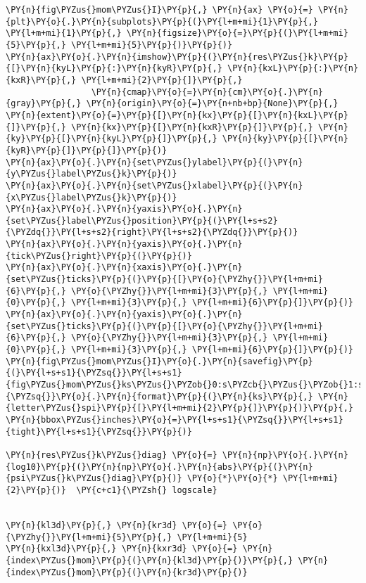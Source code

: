 \begin{Verbatim}[commandchars=\\\{\}]
\PY{n}{fig\PYZus{}mom\PYZus{}I}\PY{p}{,} \PY{n}{ax} \PY{o}{=} \PY{n}{plt}\PY{o}{.}\PY{n}{subplots}\PY{p}{(}\PY{l+m+mi}{1}\PY{p}{,} \PY{l+m+mi}{1}\PY{p}{,} \PY{n}{figsize}\PY{o}{=}\PY{p}{(}\PY{l+m+mi}{5}\PY{p}{,} \PY{l+m+mi}{5}\PY{p}{)}\PY{p}{)}
\PY{n}{ax}\PY{o}{.}\PY{n}{imshow}\PY{p}{(}\PY{n}{res\PYZus{}k}\PY{p}{[}\PY{n}{kyL}\PY{p}{:}\PY{n}{kyR}\PY{p}{,} \PY{n}{kxL}\PY{p}{:}\PY{n}{kxR}\PY{p}{,} \PY{l+m+mi}{2}\PY{p}{]}\PY{p}{,}
                 \PY{n}{cmap}\PY{o}{=}\PY{n}{cm}\PY{o}{.}\PY{n}{gray}\PY{p}{,} \PY{n}{origin}\PY{o}{=}\PY{n+nb+bp}{None}\PY{p}{,} \PY{n}{extent}\PY{o}{=}\PY{p}{[}\PY{n}{kx}\PY{p}{[}\PY{n}{kxL}\PY{p}{]}\PY{p}{,} \PY{n}{kx}\PY{p}{[}\PY{n}{kxR}\PY{p}{]}\PY{p}{,} \PY{n}{ky}\PY{p}{[}\PY{n}{kyL}\PY{p}{]}\PY{p}{,} \PY{n}{ky}\PY{p}{[}\PY{n}{kyR}\PY{p}{]}\PY{p}{]}\PY{p}{)}
\PY{n}{ax}\PY{o}{.}\PY{n}{set\PYZus{}ylabel}\PY{p}{(}\PY{n}{y\PYZus{}label\PYZus{}k}\PY{p}{)}
\PY{n}{ax}\PY{o}{.}\PY{n}{set\PYZus{}xlabel}\PY{p}{(}\PY{n}{x\PYZus{}label\PYZus{}k}\PY{p}{)}
\PY{n}{ax}\PY{o}{.}\PY{n}{yaxis}\PY{o}{.}\PY{n}{set\PYZus{}label\PYZus{}position}\PY{p}{(}\PY{l+s+s2}{\PYZdq{}}\PY{l+s+s2}{right}\PY{l+s+s2}{\PYZdq{}}\PY{p}{)}
\PY{n}{ax}\PY{o}{.}\PY{n}{yaxis}\PY{o}{.}\PY{n}{tick\PYZus{}right}\PY{p}{(}\PY{p}{)}
\PY{n}{ax}\PY{o}{.}\PY{n}{xaxis}\PY{o}{.}\PY{n}{set\PYZus{}ticks}\PY{p}{(}\PY{p}{[}\PY{o}{\PYZhy{}}\PY{l+m+mi}{6}\PY{p}{,} \PY{o}{\PYZhy{}}\PY{l+m+mi}{3}\PY{p}{,} \PY{l+m+mi}{0}\PY{p}{,} \PY{l+m+mi}{3}\PY{p}{,} \PY{l+m+mi}{6}\PY{p}{]}\PY{p}{)}
\PY{n}{ax}\PY{o}{.}\PY{n}{yaxis}\PY{o}{.}\PY{n}{set\PYZus{}ticks}\PY{p}{(}\PY{p}{[}\PY{o}{\PYZhy{}}\PY{l+m+mi}{6}\PY{p}{,} \PY{o}{\PYZhy{}}\PY{l+m+mi}{3}\PY{p}{,} \PY{l+m+mi}{0}\PY{p}{,} \PY{l+m+mi}{3}\PY{p}{,} \PY{l+m+mi}{6}\PY{p}{]}\PY{p}{)}
\PY{n}{fig\PYZus{}mom\PYZus{}I}\PY{o}{.}\PY{n}{savefig}\PY{p}{(}\PY{l+s+s1}{\PYZsq{}}\PY{l+s+s1}{fig\PYZus{}mom\PYZus{}ks\PYZus{}\PYZob{}0:s\PYZcb{}\PYZus{}\PYZob{}1:s\PYZcb{}}\PY{l+s+s1}{\PYZsq{}}\PY{o}{.}\PY{n}{format}\PY{p}{(}\PY{n}{ks}\PY{p}{,} \PY{n}{letter\PYZus{}spi}\PY{p}{[}\PY{l+m+mi}{2}\PY{p}{]}\PY{p}{)}\PY{p}{,} \PY{n}{bbox\PYZus{}inches}\PY{o}{=}\PY{l+s+s1}{\PYZsq{}}\PY{l+s+s1}{tight}\PY{l+s+s1}{\PYZsq{}}\PY{p}{)}

\PY{n}{res\PYZus{}k\PYZus{}diag} \PY{o}{=} \PY{n}{np}\PY{o}{.}\PY{n}{log10}\PY{p}{(}\PY{n}{np}\PY{o}{.}\PY{n}{abs}\PY{p}{(}\PY{n}{psi\PYZus{}k\PYZus{}diag}\PY{p}{)} \PY{o}{*}\PY{o}{*} \PY{l+m+mi}{2}\PY{p}{)}  \PY{c+c1}{\PYZsh{} logscale}


\PY{n}{kl3d}\PY{p}{,} \PY{n}{kr3d} \PY{o}{=} \PY{o}{\PYZhy{}}\PY{l+m+mi}{5}\PY{p}{,} \PY{l+m+mi}{5}
\PY{n}{kxl3d}\PY{p}{,} \PY{n}{kxr3d} \PY{o}{=} \PY{n}{index\PYZus{}mom}\PY{p}{(}\PY{n}{kl3d}\PY{p}{)}\PY{p}{,} \PY{n}{index\PYZus{}mom}\PY{p}{(}\PY{n}{kr3d}\PY{p}{)}


\end{Verbatim}
